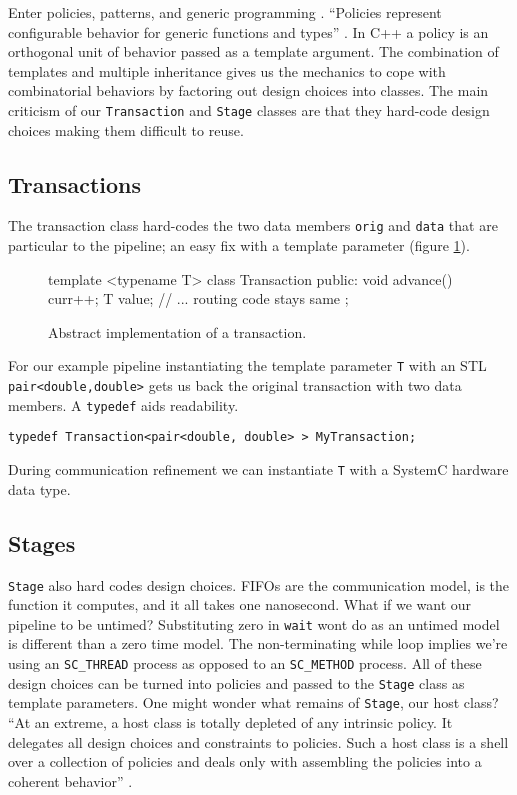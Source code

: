 \documentclass{entcs}
\begin{document}
Enter policies, patterns, and generic programming \cite{Alexandrescu01,Czarnecki,Abrahams05}.
``Policies represent configurable behavior for generic functions and types'' \cite{vandevoorde03}.
In C++ a policy is an orthogonal unit of behavior passed as a template argument.
The combination of templates and
multiple inheritance gives us the mechanics to cope with combinatorial behaviors by factoring
out design choices into classes. The main criticism of our {\tt Transaction} and {\tt Stage}
classes are that they
hard-code design choices making them difficult to reuse.

\subsection{Transactions}
The transaction class hard-codes the two data members {\tt orig} and {\tt data} that
are particular to the pipeline; an easy fix with a template parameter (figure \ref{fig:trans2}).
\begin{figure}
\begin{listing}{1}
template <typename T>
class Transaction {
public:
  void advance() { curr++; }
  T value;
  // ... routing code stays same
};
\end{listing}
\caption{\label{fig:trans2} Abstract implementation of a transaction.}
\end{figure}
For our example pipeline instantiating the template parameter {\tt T} with an STL
{\tt pair<double,double>} gets us back the
original transaction with two data members. A {\tt typedef} aids readability.
\begin{verbatim}
typedef Transaction<pair<double, double> > MyTransaction;
\end{verbatim}
During communication refinement we can instantiate {\tt T} with a SystemC hardware data type.

\subsection{Stages}
{\tt Stage} also hard codes design choices. FIFOs are the
communication model,  is the function it computes, and it all takes one nanosecond.
What if we want our pipeline to be untimed? Substituting zero in {\tt wait} wont do as
an untimed model is different than a zero time model. The non-terminating
while loop implies we're using an {\tt SC\_THREAD} process as opposed to an {\tt SC\_METHOD} process.
All of these design choices can be turned into policies and passed to the {\tt Stage} class as template
parameters. One might wonder
what remains of {\tt Stage}, our host class? ``At an extreme, a host class is totally
depleted of any intrinsic policy. It delegates all design choices and constraints to policies. Such a
host class is a shell over a collection of policies and deals only with assembling the
policies into a coherent behavior'' \cite{Alexandrescu01}.
\end{document}
